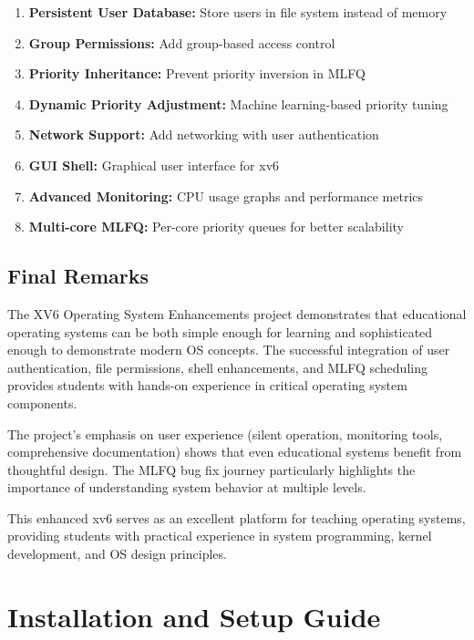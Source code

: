 \documentclass[a4paper,12pt]{report}
\begin{document}
\begin{enumerate}
    \item \textbf{Persistent User Database:} Store users in file system instead of memory
    \item \textbf{Group Permissions:} Add group-based access control
    \item \textbf{Priority Inheritance:} Prevent priority inversion in MLFQ
    \item \textbf{Dynamic Priority Adjustment:} Machine learning-based priority tuning
    \item \textbf{Network Support:} Add networking with user authentication
    \item \textbf{GUI Shell:} Graphical user interface for xv6
    \item \textbf{Advanced Monitoring:} CPU usage graphs and performance metrics
    \item \textbf{Multi-core MLFQ:} Per-core priority queues for better scalability
\end{enumerate}

\section{Final Remarks}

The XV6 Operating System Enhancements project demonstrates that educational operating systems can be both simple enough for learning and sophisticated enough to demonstrate modern OS concepts. The successful integration of user authentication, file permissions, shell enhancements, and MLFQ scheduling provides students with hands-on experience in critical operating system components.

The project's emphasis on user experience (silent operation, monitoring tools, comprehensive documentation) shows that even educational systems benefit from thoughtful design. The MLFQ bug fix journey particularly highlights the importance of understanding system behavior at multiple levels.

This enhanced xv6 serves as an excellent platform for teaching operating systems, providing students with practical experience in system programming, kernel development, and OS design principles.

\newpage

\appendix

\chapter{Installation and Setup Guide}
\thispagestyle{contentpages}
\end{document}
